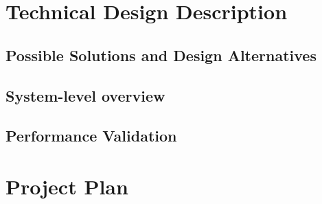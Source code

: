 \documentclass{article}
\begin{document}
\section{Technical Design Description}
\subsection{Possible Solutions and Design Alternatives}
\subsection{System-level overview}
\subsection{Performance Validation}
\section{Project Plan}
\end{document}
